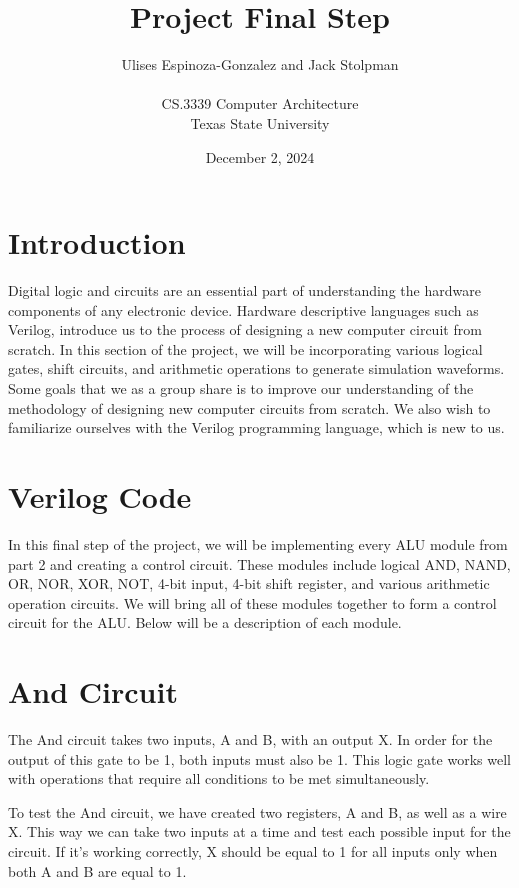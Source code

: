 \documentclass[12pt]{article}
\title{Project Final Step}
\author{Ulises Espinoza-Gonzalez and Jack Stolpman\\
\AND\\
\AND
\AND
\AND
\AND
	CS.3339 Computer Architecture\\
\AND
	Texas State University\\
}
\date{December 2, 2024}
\begin{document}
\maketitle

\newpage
\thispagestyle{empty}


\newpage
\setcounter{page}{1}
\section{Introduction}
Digital logic and circuits are an essential part of understanding the hardware components of any electronic device. Hardware descriptive languages such as Verilog, introduce us to the process of designing a new computer circuit from scratch. In this section of the project, we will be incorporating various logical gates, shift circuits, and arithmetic operations to generate simulation waveforms. Some goals that we as a group share is to improve our understanding of the methodology of designing new computer circuits from scratch. We also wish to familiarize ourselves with the Verilog programming language, which is new to us. 

\section{Verilog Code}
\label{sec:headings}

In this final step of the project, we will be implementing every ALU module from part 2 and creating a control circuit. These modules include logical AND, NAND, OR, NOR, XOR, NOT, 4-bit input, 4-bit shift register, and various arithmetic operation circuits. We will bring all of these modules together to form a control circuit for the ALU. Below will be a description of each module.





\section{And Circuit}
The And circuit takes two inputs, A and B, with an output X. In order for the output of this gate to be 1, both inputs must also be 1. This logic gate works well with operations that require all conditions to be met simultaneously.


To test the And circuit, we have created two registers, A and B, as well as a wire X. This way we can take two inputs at a time and test each possible input for the circuit. If it's working correctly, X should be equal to 1 for all inputs only when both A and B are equal to 1.

\end{document}

